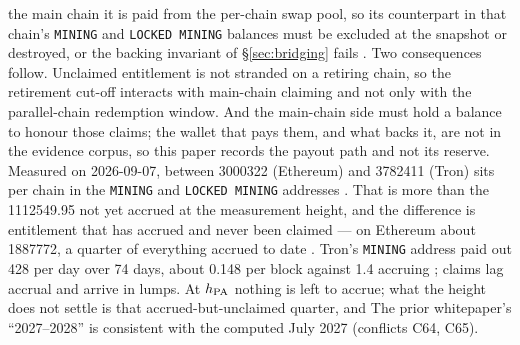 \begin{remark}
the main chain it is paid from the per-chain swap pool, so its counterpart in that chain's
\texttt{MINING} and \texttt{LOCKED MINING} balances must be excluded at the snapshot or destroyed,
or the backing invariant of \S\ref{sec:bridging} fails \srcinferred{}. Two consequences follow. Unclaimed
entitlement is not stranded on a retiring chain, so the retirement cut-off interacts with
main-chain claiming and not only with the parallel-chain redemption window. And the main-chain
side must hold a balance to honour those claims; the wallet that pays them, and what backs it, are
not in the evidence corpus, so this paper records the payout path and not its reserve. Measured on 2026-09-07, between \num{3000322}\flux{} (Ethereum)
and \num{3782411}\flux{} (Tron) sits per chain in the \texttt{MINING} and \texttt{LOCKED MINING}
addresses . That is more than
the \num{1112549.95}\flux{} not yet accrued at the measurement height, and the difference is
entitlement that has accrued and never been claimed --- on Ethereum about
\num{1887772}\flux{}, a quarter of everything accrued to date \srcinferred. Tron's
\texttt{MINING} address paid out \num{428}\flux{} per day over \num{74} days, about
\num{0.148}\flux{} per block against \num{1.4} accruing
; claims lag accrual and
arrive in lumps. At $h_{\mathrm{PA}}$ nothing is left to accrue; what the height does not settle is that
accrued-but-unclaimed quarter, and  The prior whitepaper's ``2027--2028'' \cite{fluxpouw2} is
consistent with the computed July 2027 (conflicts C64, C65).
\end{remark}

